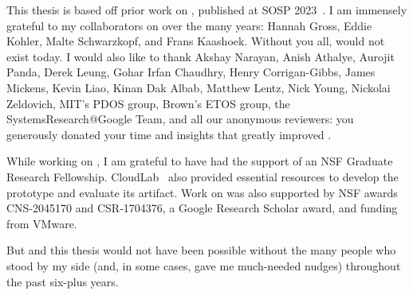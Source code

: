 
%
This thesis is based off prior work on \sys, published at SOSP 2023~\cite{edna}.
I am immensely grateful to my collaborators on \sys over the many years: Hannah
Gross, Eddie Kohler, Malte Schwarzkopf, and Frans Kaashoek. Without you all,
\sys would not exist today.
%
I would also like to thank Akshay Narayan, Anish Athalye, Aurojit Panda, Derek
Leung, Gohar Irfan Chaudhry, Henry Corrigan-Gibbs, James Mickens, Kevin Liao,
Kinan Dak Albab, Matthew Lentz, Nick Young, Nickolai Zeldovich, MIT's PDOS
group, Brown's ETOS group, the SystemsResearch@Google Team, and all our
anonymous reviewers: you generously donated your time and insights that greatly
improved \sys. 
%

%
While working on \sys, I am grateful to have had the support of an NSF Graduate
Research Fellowship.  CloudLab~\cite{cloudlab} also provided essential resources
to develop the \sys prototype and evaluate its artifact.
%
Work on \sys was also supported by NSF awards CNS-2045170 and CSR-1704376, a
Google Research Scholar award, and funding from VMware.
%

%
But \sys and this thesis would not have been possible without the many people
who stood by my side (and, in some cases, gave me much-needed nudges) throughout
the past six-plus years.
%

